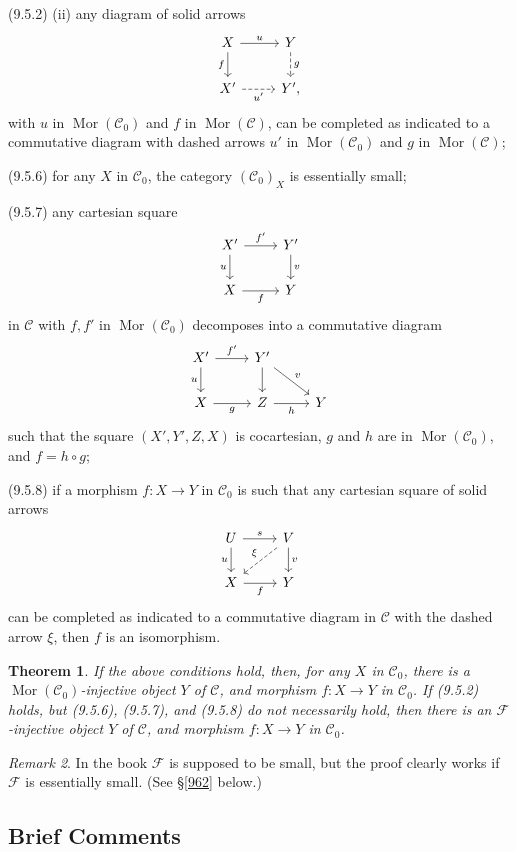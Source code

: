 \documentclass[12pt]{article}
\newtheorem{thm}{Theorem}
\theoremstyle{remark}
\newtheorem{rk}[thm]{Remark}
\theoremstyle{definition}
\newcommand{\nn}{\noindent}
\newcommand{\cc}{\mathcal}
\newcommand{\C}{\mathcal C}
\newcommand{\F}{\mathcal F}
\DeclareMathOperator{\Mor}{Mor}
\begin{document}
\nn(9.5.2) (ii) any diagram of solid arrows
$$
\begin{tikzcd}
X\ar{d}[swap]{f}\ar{r}{u}&Y\ar[dashed]{d}{g}\\ 
X'\ar[dashed]{r}[swap]{u'}&Y',
\end{tikzcd}
$$ 
with $u$ in $\Mor(\C_0)$ and $f$ in $\Mor(\C)$, can be completed as indicated to a commutative diagram with dashed arrows $u'$ in $\Mor(\C_0)$ and $g$ in $\Mor(\C)$; 

\nn(9.5.6) for any $X$ in $\C_0$, the category $(\C_0)_X$ is essentially small;

\nn(9.5.7) any cartesian square 
$$
\begin{tikzcd}
X'\ar{d}[swap]{u}\ar{r}{f'}&Y'\ar{d}{v}\\ 
X\ar{r}[swap]{f}&Y
\end{tikzcd}
$$ 
in $\C$ with $f,f'$ in $\Mor(\C_0)$ decomposes into a commutative diagram 
$$
\begin{tikzcd}
X'\ar{d}[swap]{u}\ar{r}{f'}&Y'\ar{d}\ar{rd}{v}\\ 
X\ar{r}[swap]{g}&Z\ar{r}[swap]{h}&Y
\end{tikzcd}
$$ 
such that the square $(X',Y',Z,X)$ is cocartesian, $g$ and $h$ are in $\Mor(\C_0)$, and $f=h\circ g$; 

\nn(9.5.8) if a morphism $f:X\to Y$ in $\C_0$ is such that any cartesian square of solid arrows
$$
\begin{tikzcd}
U\ar{d}[swap]{u}\ar{r}{s}&V\ar{d}{v}\ar[dashed]{ld}[swap]{\xi}\\ 
X\ar{r}[swap]{f}&Y
\end{tikzcd}
$$ 
can be completed as indicated to a commutative diagram in $\C$ with the dashed arrow $\xi$, then $f$ is an isomorphism. 
%
\begin{thm} 
If the above conditions hold, then, for any $X$ in $\C_0$, there is a $\Mor(\C_0)$-injective object $Y$ of $\C$, and morphism $f:X\to Y$ in $\C_0$. If (9.5.2) holds, but (9.5.6), (9.5.7), and (9.5.8) do not necessarily hold, then there is an $\F$-injective object $Y$ of $\C$, and morphism $f:X\to Y$ in $\C_0$.
\end{thm}
%
\begin{rk}\label{954}
In the book $\cc F$ is supposed to be small, but the proof clearly works if $\cc F$ is essentially small. (See \S\ref{962} below.)
\end{rk}


\subsection{Brief Comments}
\end{document}
